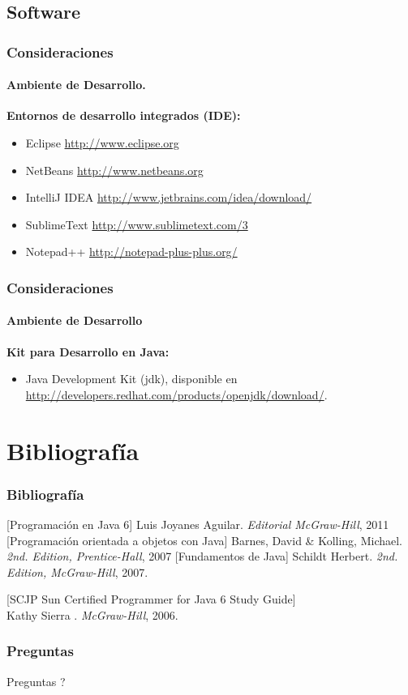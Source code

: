 \documentclass{beamer}
\begin{document}
		\subsection{Software}

		\begin{frame}
			\frametitle{Consideraciones}
			\framesubtitle{Ambiente de Desarrollo.}

			\textbf{Entornos de desarrollo integrados (IDE):}
			
			\begin{itemize}
				\item Eclipse  \url{http://www.eclipse.org}
				\item NetBeans \url{http://www.netbeans.org}
				\item IntelliJ IDEA  \url{http://www.jetbrains.com/idea/download/}
				\item SublimeText   \url{http://www.sublimetext.com/3}
				\item Notepad++  \url{http://notepad-plus-plus.org/}
			\end{itemize}

		\end{frame}

		\begin{frame}
			\frametitle{Consideraciones}
			\framesubtitle{Ambiente de Desarrollo}

			\textbf{Kit para Desarrollo en Java:}
			
			\begin{itemize}
				\item Java Development Kit (jdk), disponible en \url{http://developers.redhat.com/products/openjdk/download/}.
			\end{itemize}
		\end{frame}

	\section{Bibliograf\'ia}

		\begin{frame}
			\frametitle{Bibliograf\'ia}

			\begin{thebibliography}{10} 
				\beamertemplatebookbibitems 
				[Programaci\'on en Java 6] Luis Joyanes Aguilar. \newblock \emph{Editorial McGraw-Hill}, 2011
				[Programaci\'on orientada a objetos con Java] Barnes, David \& Kolling, Michael. \newblock \emph{2nd. Edition, Prentice-Hall}, 2007
				[Fundamentos de Java] Schildt Herbert. \newblock \emph{2nd. Edition, McGraw-Hill}, 2007.

[SCJP Sun Certified Programmer for Java 6 Study Guide]\\ Kathy Sierra . \newblock \emph{ McGraw-Hill}, 2006.
			\end{thebibliography} 
		\end{frame}

		\begin{frame}
			\frametitle{Preguntas}

			\hspace{4cm}\huge{Preguntas ?}
		
		\end{frame}
	
\end{document}
